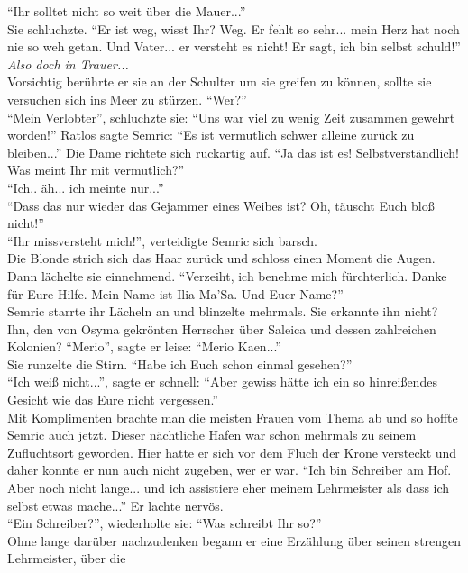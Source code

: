 ``Ihr solltet nicht so weit über die Mauer...''\\
Sie schluchzte. ``Er ist weg, wisst Ihr? Weg. Er fehlt so sehr... mein Herz hat noch nie so weh 
getan. Und Vater... er versteht es nicht! Er sagt, ich bin selbst schuld!''\\
\textit{Also doch in Trauer...}\\ Vorsichtig berührte er sie an der Schulter um sie greifen zu 
können, sollte sie versuchen sich ins Meer zu stürzen. ``Wer?''\\
``Mein Verlobter'', schluchzte sie: ``Uns war viel zu wenig Zeit zusammen gewehrt worden!''
Ratlos sagte Semric: ``Es ist vermutlich schwer alleine zurück zu bleiben...''
Die Dame richtete sich ruckartig auf. ``Ja das ist es! Selbstverständlich! Was meint Ihr mit 
vermutlich?''\\
``Ich.. äh... ich meinte nur...''\\
``Dass das nur wieder das Gejammer eines Weibes ist? Oh, täuscht Euch bloß nicht!''\\
``Ihr missversteht mich!'', verteidigte Semric sich barsch.\\
Die Blonde strich sich das Haar zurück und schloss einen Moment die Augen. Dann lächelte sie 
einnehmend. ``Verzeiht, ich benehme mich fürchterlich. Danke für Eure Hilfe. Mein Name ist Ilia 
Ma'Sa. Und Euer Name?''\\
Semric starrte ihr Lächeln an und blinzelte mehrmals. Sie erkannte ihn nicht? Ihn, den von Osyma 
gekrönten Herrscher über Saleica und dessen zahlreichen Kolonien? ``Merio'', sagte er leise: 
``Merio Kaen...''\\
Sie runzelte die Stirn. ``Habe ich Euch schon einmal gesehen?''\\
``Ich weiß nicht...'', sagte er schnell: ``Aber gewiss hätte ich ein so hinreißendes Gesicht wie 
das Eure nicht vergessen.''\\
Mit Komplimenten brachte man die meisten Frauen vom Thema ab und so hoffte Semric auch jetzt. 
Dieser nächtliche Hafen war schon mehrmals zu seinem Zufluchtsort geworden. Hier hatte er sich vor 
dem Fluch der Krone versteckt und daher konnte er nun auch nicht zugeben, wer er war. 
``Ich bin Schreiber am Hof. Aber noch nicht lange... und ich assistiere eher meinem Lehrmeister als 
dass ich selbst etwas mache...'' Er lachte nervös. \\
``Ein Schreiber?'', wiederholte sie: ``Was schreibt Ihr so?''\\
Ohne lange darüber nachzudenken begann er eine Erzählung über seinen strengen Lehrmeister, über die 
